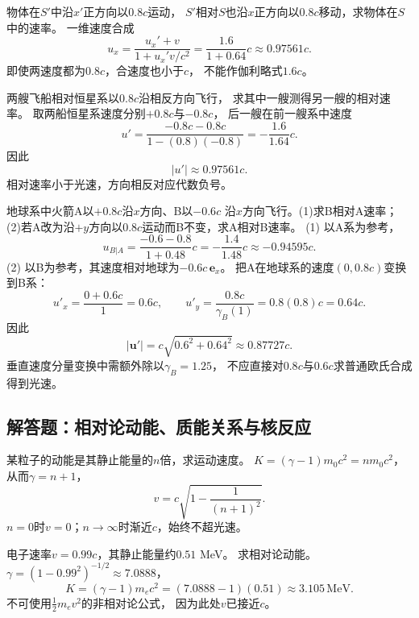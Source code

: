 \problemtext 物体在$S'$中沿$x'$正方向以$0.8c$运动，
$S'$相对$S$也沿$x$正方向以$0.8c$移动，求物体在$S$中的速率。
\workings
一维速度合成
\[
\boxed{u_x=\frac{u_x'+v}{1+u_x'v/c^2}
=\frac{1.6}{1+0.64}c
\approx0.97561c}.
\]
\crosscheck 即使两速度都为$0.8c$，合速度也小于$c$，
不能作伽利略式$1.6c$。

\problemtext 两艘飞船相对恒星系以$0.8c$沿相反方向飞行，
求其中一艘测得另一艘的相对速率。
\workings
取两船恒星系速度分别$+0.8c$与$-0.8c$，
后一艘在前一艘系中速度
\[
u'=\frac{-0.8c-0.8c}{1-(0.8)(-0.8)}
=-\frac{1.6}{1.64}c.
\]
因此
\[
\boxed{|u'|\approx0.97561c}.
\]
\crosscheck 相对速率小于光速，方向相反对应代数负号。

\problemtext 地球系中火箭A以$+0.8c$沿$x$方向、B以$-0.6c$
沿$x$方向飞行。(1)求B相对A速率；
(2)若A改为沿$+y$方向以$0.8c$运动而B不变，求A相对B速率。
\workings
(1) 以A系为参考，
\[
\boxed{u_{B|A}=\frac{-0.6-0.8}{1+0.48}c
=-\frac{1.4}{1.48}c\approx-0.94595c}.
\]
(2) 以B为参考，其速度相对地球为$-0.6c\,\bm e_x$。
把A在地球系的速度$(0,0.8c)$变换到B系：
\[
u'_x=\frac{0+0.6c}{1}=0.6c,\qquad
u'_y=\frac{0.8c}{\gamma_B(1)}=0.8(0.8)c=0.64c.
\]
因此
\[
\boxed{|\bm u'|=c\sqrt{0.6^2+0.64^2}
\approx0.87727c}.
\]
\crosscheck 垂直速度分量变换中需额外除以$\gamma_B=1.25$，
不应直接对$0.8c$与$0.6c$求普通欧氏合成得到光速。

\subsection{解答题：相对论动能、质能关系与核反应}

\problemtext 某粒子的动能是其静止能量的$n$倍，求运动速度。
\workings
$K=(\gamma-1)m_0c^2=nm_0c^2$，
从而$\gamma=n+1$，
\[
\boxed{v=c\sqrt{1-\frac1{(n+1)^2}}}.
\]
\crosscheck $n=0$时$v=0$；$n\to\infty$时渐近$c$，始终不超光速。

\problemtext 电子速率$v=0.99c$，其静止能量约$0.51$ MeV。
求相对论动能。
\workings
$\gamma=(1-0.99^2)^{-1/2}\approx7.0888$，
\[
\boxed{K=(\gamma-1)m_ec^2
=(7.0888-1)(0.51)
\approx3.105\,\mathrm{MeV}}.
\]
\crosscheck 不可使用$\frac12m_ev^2$的非相对论公式，
因为此处$v$已接近$c$。

